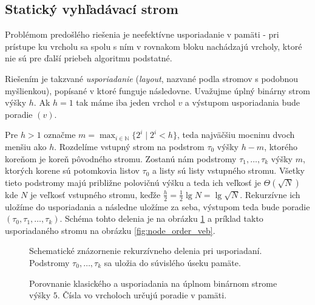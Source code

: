 \subsection{Statický \obliv vyhľadávací strom} \label{sec:static-obliv}
Problémom predošlého riešenia je neefektívne usporiadanie v pamäti - pri prístupe ku vrcholu sa spolu s ním v rovnakom bloku nachádzajú vrcholy, ktoré nie sú pre ďalší priebeh algoritmu podstatné. 

Riešením je takzvané \vEB \emph{usporiadanie} (\vEB \emph{layout}, nazvané podla \vEB stromov s podobnou myšlienkou), popísané v \citep{prokop1999cache,btreeshort,demaineoverview} ktoré funguje následovne. Uvažujme úplný binárny strom výšky $h$. Ak $h=1$ tak máme iba jeden vrchol $v$ a výstupom usporiadania bude poradie $(v)$.

Pre $h>1$ označme $m = \max_{i\in\mathbb{N}}\{2^i \mid 2^i < h\}$, teda najväčšiu mocninu dvoch menšiu ako $h$. Rozdelíme vstupný strom na podstrom $\tau_0$ výšky $h-m$, ktorého koreňom je koreň pôvodného stromu. Zostanú nám podstromy $\tau_1,\dotsc,\tau_k$ výšky $m$, ktorých korene sú potomkovia listov $\tau_0$ a listy sú listy vstupného stromu. Všetky tieto podstromy majú približne polovičnú výšku a teda ich veľkosť je $\Theta(\sqrt{N})$ kde $N$ je veľkosť vstupného stromu, keďže $\frac{h}{2} = \frac{1}{2}\lg{N} = \lg{\sqrt{N}}$. Rekurzívne ich uložíme do \vEB usporiadania a následne uložíme za seba, výstupom teda bude poradie $(\tau_0,\tau_1,\dotsc,\tau_k)$. Schéma tohto delenia je na obrázku \ref{fig:veblayout_scheme} a príklad takto usporiadaného stromu na obrázku \ref{fig:node_order_veb}.

\begin{figure}
    \centering
    \resizebox{0.9\textwidth}{!}{
        
    }
    \caption[Schematické znázornenie rekurzívneho delenia]{Schematické znázornenie rekurzívneho delenia pri \vEB usporiadaní. Podstromy $\tau_0,\dotsc,\tau_k$ sa uložia do súvislého úseku pamäte.}
    \label{fig:veblayout_scheme}
\end{figure}

\begin{figure}
    \centering
    \caption[Porovnanie klasického a \vEB usporiadania]{Porovnanie klasického a \vEB usporiadania na úplnom binárnom strome výšky $5$. Čísla vo vrcholoch určujú poradie v pamäti.}
    \label{fig:node_order_comparison}
\end{figure}

